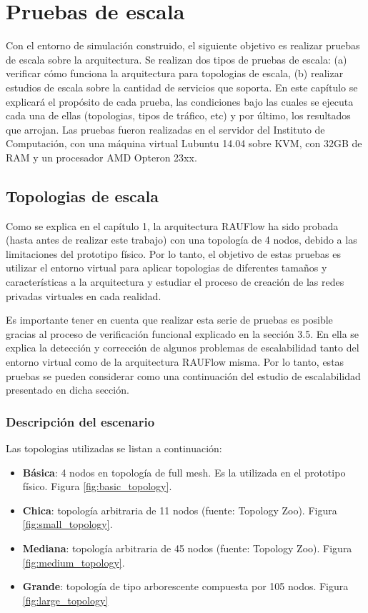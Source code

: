 \chapter{Pruebas de escala}

\graphicspath{{Chapter4/Figs/}}

Con el entorno de simulación construido, el siguiente objetivo es realizar pruebas de escala sobre la arquitectura. Se realizan dos tipos de pruebas de escala: (a) verificar cómo funciona la arquitectura para topologias de escala, (b) realizar estudios de escala sobre la cantidad de servicios que soporta. En este capítulo se explicará el propósito de cada prueba, las condiciones bajo las cuales se ejecuta cada una de ellas (topologias, tipos de tráfico, etc) y por último, los resultados que arrojan. Las pruebas fueron realizadas en el servidor del Instituto de Computación, con una máquina virtual Lubuntu 14.04 sobre KVM, con 32GB de RAM y un procesador AMD Opteron 23xx.

\section{Topologias de escala}
Como se explica en el capítulo 1, la arquitectura RAUFlow ha sido probada (hasta antes de realizar este trabajo) con una topología de 4 nodos, debido a las limitaciones del prototipo físico. Por lo tanto, el objetivo de estas pruebas es utilizar el entorno virtual para aplicar topologias de diferentes tamaños y características a la arquitectura y estudiar el proceso de creación de las redes privadas virtuales en cada realidad.

Es importante tener en cuenta que realizar esta serie de pruebas es posible gracias al proceso de verificación funcional explicado en la sección 3.5. En ella se explica la detección y corrección de algunos problemas de escalabilidad tanto del entorno virtual como de la arquitectura RAUFlow misma. Por lo tanto, estas pruebas se pueden considerar como una continuación del estudio de escalabilidad presentado en dicha sección.

\subsection{Descripción del escenario}

Las topologias utilizadas se listan a continuación:
\begin{itemize}
	\item \textbf{Básica}: 4 nodos en topología de full mesh. Es la utilizada en el prototipo físico. Figura \ref{fig:basic_topology}.
	\item \textbf{Chica}: topología arbitraria de 11 nodos (fuente: Topology Zoo). Figura \ref{fig:small_topology}.
	\item \textbf{Mediana}: topología arbitraria de 45 nodos (fuente: Topology Zoo). Figura \ref{fig:medium_topology}.
	\item \textbf{Grande}: topología de tipo arborescente compuesta por 105 nodos. Figura \ref{fig:large_topology}
\end{itemize}

